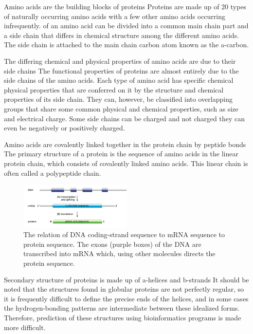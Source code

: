 \documentclass{article}
\begin{document}
Amino acids are the building blocks of proteins
Proteins are made up of 20 types of naturally occurring amino acids with a few other amino acids occurring infrequently. of an amino acid can be divided into a common main chain part and a side chain that differs in chemical structure among the different amino acids. The side chain is attached to the main chain carbon atom known as the a-carbon.

The differing chemical and physical properties of amino acids are due to their side chains
The functional properties of proteins are almost entirely due to the side chains of the amino acids. Each type of amino acid has specific chemical physical properties that are conferred on it by the structure and chemical properties of its side chain. They can, however, be classified into overlapping groups that share some common physical and chemical properties, such as size and electrical charge. Some side chains can be charged and not charged they can even be negatively or positively charged. 

Amino acids are covalently linked together in the protein chain by peptide bonds
The primary structure of a protein is the sequence of amino acids in the linear protein chain, which consists of covalently linked amino acids. This linear chain is often called a polypeptide chain.

\begin{figure}
    \centering
    \includegraphics[width=0.5\textwidth]{Transcription and translation.png}
    \caption{\label{fig:Transcription and translation}The relation of DNA coding-strand sequence to mRNA sequence to protein sequence. The exons (purple boxes) of the DNA are transcribed into mRNA which, using other molecules directs the protein sequence.}
\end{figure}

Secondary structure of proteins is made up of a-helices and b-strands
It should be noted that the structures found in globular proteins are not perfectly regular, so it is frequently difficult to define the precise ends of the helices, and in some cases the hydrogen-bonding patterns are intermediate between these idealized forms. Therefore, prediction of these structures using bioinformatics programs is made more difficult.
\end{document}
